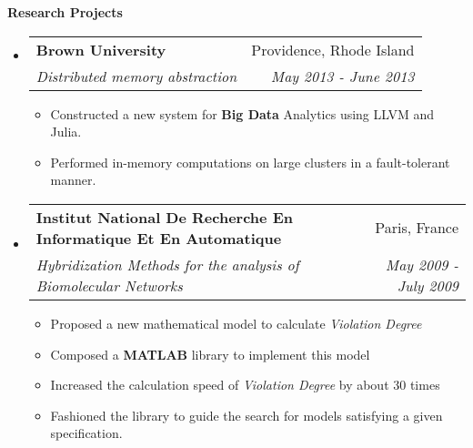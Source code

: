\documentclass[letterpaper,11pt]{article}
\makeatletter
\newcommand{\resitem}[1]{\item[\ding{226}] #1 \vspace{-2pt}}
\newcommand{\resheading}[1]{{\large \colorbox{mygrey}{\begin{minipage}{\textwidth}{\textbf{#1 \vphantom{p\^{E}}}}\end{minipage}}}}
\newcommand{\ressubheading}[4]{
\begin{tabular*}{7.0in}{l@{\extracolsep{\fill}}r}
		\textbf{#1} & #2 \\
		\textit{#3} & \textit{#4} \\
\end{tabular*}\vspace{-6pt}}
\newcommand{\reslineheading}[2]{
\begin{tabular*}{7.0in}{l@{\extracolsep{\fill}}r}
		\textbf{#1} & #2 \\
\end{tabular*}\vspace{-6pt}}
\makeatother
\begin{document}
\resheading{Research Projects}
\begin{itemize}

\item
	\ressubheading{Brown University}{Providence, Rhode Island}{Distributed memory abstraction}{May 2013 - June 2013}
	\begin{itemize}
		\resitem{Constructed a new system for \textbf{Big Data} Analytics using LLVM and Julia.} 
		\resitem{Performed in-memory computations on large clusters in a fault-tolerant manner.}
	\end{itemize}

\item
	\ressubheading{Institut National De Recherche En Informatique Et En Automatique}{Paris, France}{Hybridization Methods for the analysis of Biomolecular Networks}{May 2009 - July 2009}
	\begin{itemize}
		\resitem{Proposed a new mathematical model to calculate \textit{Violation Degree}}%
        \resitem{Composed a \textbf{MATLAB} library to implement this model}
        \resitem{Increased the calculation speed of \textit{Violation Degree} by about 30 times}
        \resitem{Fashioned the library to guide the search for models satisfying a given specification.}
	\end{itemize}


\end{itemize}
\end{document}
